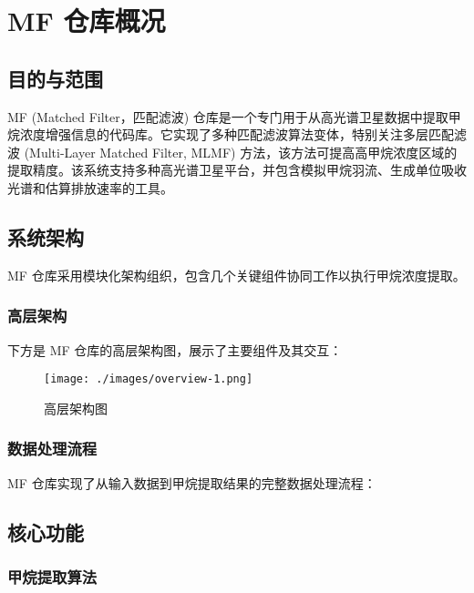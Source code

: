 \section{MF 仓库概况}\label{mf-ux4ed3ux5e93ux6982ux51b5}

\subsection{目的与范围}\label{ux76eeux7684ux4e0eux8303ux56f4}

MF (Matched Filter，匹配滤波)
仓库是一个专门用于从高光谱卫星数据中提取甲烷浓度增强信息的代码库。它实现了多种匹配滤波算法变体，特别关注多层匹配滤波
(Multi-Layer Matched Filter, MLMF)
方法，该方法可提高高甲烷浓度区域的提取精度。该系统支持多种高光谱卫星平台，并包含模拟甲烷羽流、生成单位吸收光谱和估算排放速率的工具。

\subsection{系统架构}\label{ux7cfbux7edfux67b6ux6784}

MF 仓库采用模块化架构组织，包含几个关键组件协同工作以执行甲烷浓度提取。

\subsubsection{高层架构}\label{ux9ad8ux5c42ux67b6ux6784}

下方是 MF 仓库的高层架构图，展示了主要组件及其交互：

\begin{figure}
\centering
\texttt{[image: ./images/overview-1.png]}
\caption{高层架构图}
\end{figure}

\subsubsection{数据处理流程}\label{ux6570ux636eux5904ux7406ux6d41ux7a0b}

MF 仓库实现了从输入数据到甲烷提取结果的完整数据处理流程：

\subsection{核心功能}\label{ux6838ux5fc3ux529fux80fd}

\subsubsection{甲烷提取算法}\label{ux7532ux70f7ux63d0ux53d6ux7b97ux6cd5}

